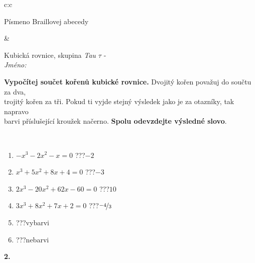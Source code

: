 \documentclass[10pt]{report}
\begin{document}
\begin{tabular}{c:c}
\begin{minipage}[c][104.5mm][t]{0.5\linewidth}
\begin{center}
\begin{minipage}{0.20\linewidth}
\begin{center}
{\small Písmeno Braillovej abecedy}
\end{center}
\end{minipage}
\end{center}
\end{minipage}
&
\begin{minipage}[c][104.5mm][t]{0.5\linewidth}
\begin{center}
\vspace{7mm}
{\huge Kubická rovnice, skupina \textit{Tau $\tau$} -}\\[5mm]
\textit{Jméno:}\phantom{xxxxxxxxxxxxxxxxxxxxxxxxxxxxxxxxxxxxxxxxxxxxxxxxxxxxxxxxxxxxxxxxx}\\[5mm]
\begin{minipage}{0.95\linewidth}
\begin{center}
\textbf{Vypočítej součet kořenů kubické rovnice.} Dvojitý kořen považuj do součtu za dva,\\trojitý kořen za tři. Pokud ti vyjde stejný výsledek jako je za otazníky, tak napravo\\barvi příslušející kroužek načerno. \textbf{Spolu odevzdejte výsledné slovo}.
\end{center}
\end{minipage}
\\[1mm]
\begin{minipage}{0.79\linewidth}
\begin{center}
\begin{varwidth}{\linewidth}
\begin{enumerate}
\Large
\item $-x^3-2x^2-x=0$\quad \dotfill\; ???\;\dotfill \quad $-2$
\item $x^3+5x^2+8x+4=0$\quad \dotfill\; ???\;\dotfill \quad $-3$
\item $2x^3-20x^2+62x-60=0$\quad \dotfill\; ???\;\dotfill \quad $10$
\item $3x^3+8x^2+7x+2=0$\quad \dotfill\; ???\;\dotfill \quad $\nicefrac{-4}{3}$
\item \quad \dotfill\; ???\;\dotfill \quad vybarvi
\item \quad \dotfill\; ???\;\dotfill \quad nebarvi
\end{enumerate}
\end{varwidth}
\end{center}
\end{minipage}
\begin{minipage}{0.20\linewidth}
\begin{center}
{\Huge\bfseries 2.} \\[2mm]

\end{center}
\end{minipage}
\end{center}
\end{minipage}
\end{tabular}
\end{document}
